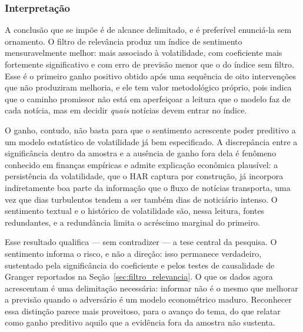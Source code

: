 \subsubsection{Interpretação}

A conclusão que se impõe é de alcance delimitado, e é preferível enunciá-la sem ornamento. O filtro
de relevância produz um índice de sentimento mensuravelmente melhor: mais associado à volatilidade,
com coeficiente mais fortemente significativo e com erro de previsão menor que o do índice sem
filtro. Esse é o primeiro ganho positivo obtido após uma sequência de oito intervenções que não
produziram melhoria, e ele tem valor metodológico próprio, pois indica que o caminho promissor não
está em aperfeiçoar a leitura que o modelo faz de cada notícia, mas em decidir \emph{quais} notícias
devem entrar no índice.

O ganho, contudo, não basta para que o sentimento acrescente poder preditivo a um modelo
estatístico de volatilidade já bem especificado. A discrepância entre a significância dentro da
amostra e a ausência de ganho fora dela é fenômeno conhecido em finanças empíricas
\cite{hansen_forecast_2005} e admite explicação econômica plausível: a persistência da volatilidade,
que o HAR captura por construção, já incorpora indiretamente boa parte da informação que o fluxo de
notícias transporta, uma vez que dias turbulentos tendem a ser também dias de noticiário intenso. O
sentimento textual e o histórico de volatilidade são, nessa leitura, fontes redundantes, e a
redundância limita o acréscimo marginal do primeiro.

Esse resultado qualifica --- sem contradizer --- a tese central da pesquisa. O sentimento informa o
risco, e não a direção: isso permanece verdadeiro, sustentado pela significância do coeficiente e
pelos testes de causalidade de Granger reportados na Seção~\ref{sec:filtro_relevancia}. O que os
dados agora acrescentam é uma delimitação necessária: informar não é o mesmo que melhorar a
previsão quando o adversário é um modelo econométrico maduro. Reconhecer essa distinção parece mais
proveitoso, para o avanço do tema, do que relatar como ganho preditivo aquilo que a evidência fora
da amostra não sustenta.
